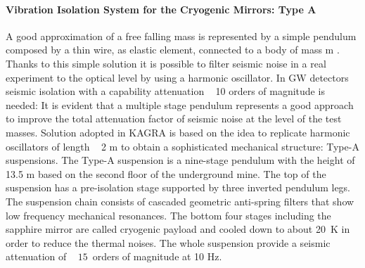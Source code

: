\paragraph*{\bi Vibration Isolation System for the Cryogenic Mirrors: Type A }
A good approximation of a free falling mass is represented by a simple pendulum composed by a thin wire, as elastic element, connected to a body of mass m . Thanks to this simple solution it is possible to filter seismic noise in a real experiment to the optical level by using a harmonic oscillator. In GW detectors seismic isolation with a capability attenuation ~ 10 orders of magnitude is needed: It is evident that a multiple stage pendulum represents a good approach to improve the total attenuation factor of seismic noise at the level of the test masses. Solution adopted in KAGRA is based on the idea to replicate harmonic oscillators of length ~ 2 m to obtain a sophisticated mechanical structure: Type-A suspensions.
The Type-A suspension is a nine-stage pendulum with the height of 13.5 m based on the second floor of the underground mine. The top of the suspension has a pre-isolation stage supported by three inverted pendulum legs. The suspension chain consists of cascaded geometric anti-spring filters that show low frequency mechanical resonances. 
The bottom four stages including the sapphire mirror are called cryogenic payload and cooled down to about 20\, K in order to reduce the thermal noises. The whole suspension provide a seismic attenuation of ~ $15$\, orders of magnitude at 10 Hz.


